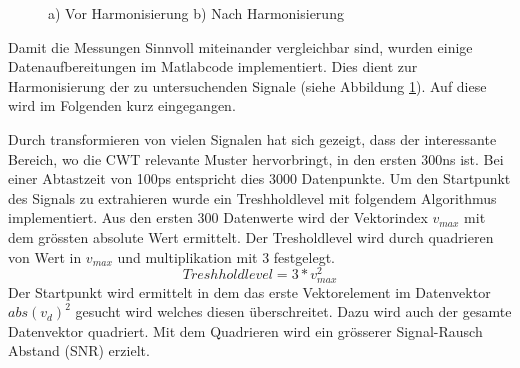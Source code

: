 \begin{refsection}
\begin{figure}
	\begin{subfigure}
		\centering
	\end{subfigure}
	\begin{subfigure}
		\centering
	\end{subfigure}	
\caption{a) Vor Harmonisierung b) Nach Harmonisierung}
\label{fig:Zeitsig}
\end{figure}

Damit die Messungen Sinnvoll miteinander vergleichbar sind, wurden einige Datenaufbereitungen im Matlabcode implementiert.
Dies dient zur Harmonisierung der zu untersuchenden Signale (siehe Abbildung \ref{fig:Zeitsig}). 
Auf diese wird im Folgenden kurz eingegangen.

Durch transformieren von vielen Signalen hat sich gezeigt, dass der interessante Bereich, wo die CWT relevante Muster hervorbringt, in den ersten 300ns ist.
Bei einer Abtastzeit von 100ps entspricht dies 3000 Datenpunkte.
Um den Startpunkt des Signals zu extrahieren wurde ein Treshholdlevel mit folgendem Algorithmus implementiert.
Aus den ersten 300 Datenwerte wird der Vektorindex $v_{max}$ mit dem grössten absolute Wert ermittelt.
Der Tresholdlevel wird durch quadrieren von Wert in $v_{max}$ und multiplikation mit 3 festgelegt.
\begin{equation}
Treshholdlevel = 3*v_{max}^2
\end{equation}
Der Startpunkt wird ermittelt in dem das erste Vektorelement im Datenvektor $abs(v_d)^2$ gesucht wird welches diesen überschreitet.
Dazu wird auch der gesamte Datenvektor quadriert.
Mit dem Quadrieren wird ein grösserer Signal-Rausch Abstand (SNR) erzielt.


\end{refsection}
